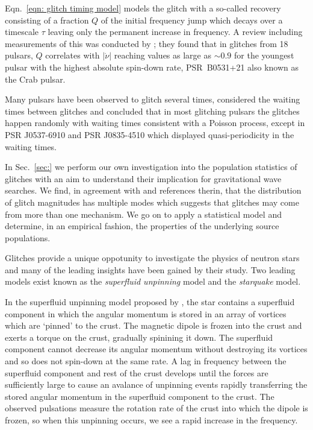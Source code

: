 Eqn.~\eqref{eqn: glitch timing model} models the glitch with a so-called recovery
consisting of a fraction $Q$ of the initial frequency jump which decays over
a timescale $\tau$ leaving only the permanent increase in frequency. A review
including measurements of this was conducted by \citet{Lyne2000}; they found
that in glitches from 18 pulsars, $Q$ correlates with $|\dot{\nu}|$ reaching
values as large as $\sim0.9$ for the youngest pulsar with the highest absolute
spin-down rate, PSR~B0531+21 also known as the Crab pulsar.

Many pulsars have been observed to glitch several times, \citet{Melatos2008}
considered the waiting times between glitches and concluded that in most
glitching pulsars the glitches happen randomly with waiting times consistent
with a Poisson process, except in PSR J0537-6910 and PSR J0835-4510 which
displayed quasi-periodicity in the waiting times.

In Sec.~\ref{sec:} we perform our own investigation into the population
statistics of glitches with an aim to understand their implication for
gravitational wave searches. We find, in agreement with \citet{Espinoza2011}
and references therin, that the distribution of glitch magnitudes has multiple
modes which suggests that glitches may come from more than one mechanism. We go
on to apply a statistical model and determine, in an empirical fashion, the
properties of the underlying source populations.

Glitches provide a unique oppotunity to investigate the physics of neutron stars
and many of the leading insights have been gained by their study. Two leading
models exist known as the \emph{superfluid unpinning} model and the \emph{starquake} model.

In the superfluid unpinning model proposed by \citet{Anderson1975}, the star
contains a superfluid component in which the angular momentum is stored in an
array of vortices which are `pinned' to the crust. The magnetic dipole is
frozen into the crust and exerts a torque on the crust, gradually spinining it
down. The superfluid component cannot decrease its angular momentum without
destroying its vortices and so does not spin-down at the same rate.  A lag in
frequency between the superfluid component and rest of the crust develops until
the forces are sufficiently large to cause an avalance of unpinning events
rapidly transferring the stored angular momentum in the superfluid component to
the crust. The observed pulsations measure the rotation rate of the crust into
which the dipole is frozen, so when this unpinning occurs, we see a rapid
increase in the frequency.

